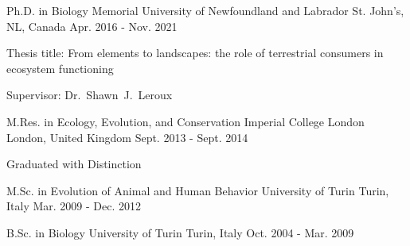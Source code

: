 

\begin{cventries}

  \cventry
    {Ph.D. in Biology} %
    {Memorial University of Newfoundland and Labrador} %
    {St. John's, NL, Canada} %
    {Apr. 2016 - Nov. 2021} %
    {
      \begin{cvitems} %
        \item {Thesis title: From elements to landscapes: the role of terrestrial consumers in ecosystem functioning}
        \item {Supervisor: Dr.~Shawn~J.~Leroux}
      \end{cvitems}
    }

  \cventry
    {M.Res. in Ecology, Evolution, and Conservation} %
    {Imperial College London} %
    {London, United Kingdom} %
    {Sept. 2013 - Sept. 2014} %
    {
      \begin{cvitems} %
        \item {Graduated with Distinction}
      \end{cvitems}
    }
  
  \cventry
    {M.Sc. in Evolution of Animal and Human Behavior} %
    {University of Turin} %
    {Turin, Italy} %
    {Mar. 2009 - Dec. 2012} %
    {
    }
  
  \cventry
    {B.Sc. in Biology} %
    {University of Turin} %
    {Turin, Italy} %
    {Oct. 2004 - Mar. 2009} %
    {
    }
\end{cventries}

